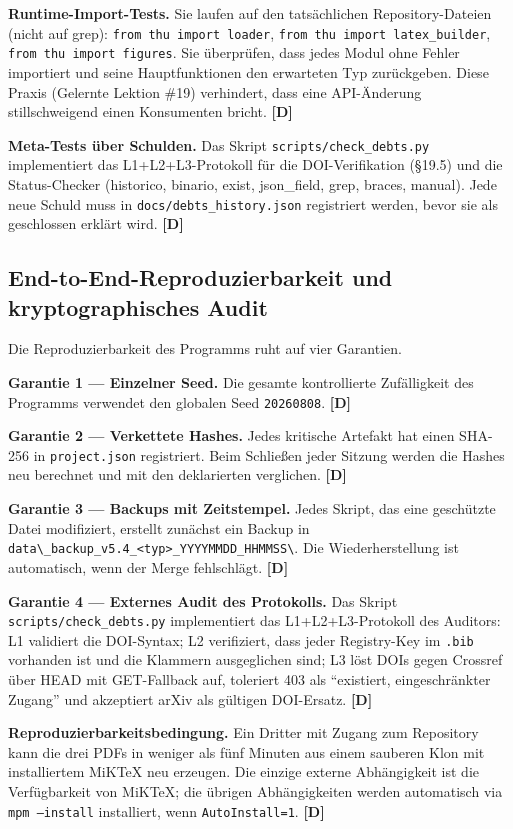 ﻿\documentclass[11pt,letterpaper]{article}
\begin{document}
\textbf{Runtime-Import-Tests.} Sie laufen auf den tatsächlichen Repository-Dateien (nicht auf grep): \texttt{from thu import loader}, \texttt{from thu import latex\_builder}, \texttt{from thu import figures}. Sie überprüfen, dass jedes Modul ohne Fehler importiert und seine Hauptfunktionen den erwarteten Typ zurückgeben. Diese Praxis (Gelernte Lektion \#19) verhindert, dass eine API-Änderung stillschweigend einen Konsumenten bricht. \textbf{[D]}

\textbf{Meta-Tests über Schulden.} Das Skript \texttt{scripts/check\_debts.py} implementiert das L1+L2+L3-Protokoll für die DOI-Verifikation (§19.5) und die Status-Checker (historico, binario, exist, json\_field, grep, braces, manual). Jede neue Schuld muss in \texttt{docs/debts\_history.json} registriert werden, bevor sie als geschlossen erklärt wird. \textbf{[D]}
\subsection{End-to-End-Reproduzierbarkeit und kryptographisches Audit}
Die Reproduzierbarkeit des Programms ruht auf vier Garantien.

\textbf{Garantie 1 --- Einzelner Seed.} Die gesamte kontrollierte Zufälligkeit des Programms verwendet den globalen Seed \texttt{20260808}. \textbf{[D]}

\textbf{Garantie 2 --- Verkettete Hashes.} Jedes kritische Artefakt hat einen SHA-256 in \texttt{project.json} registriert. Beim Schließen jeder Sitzung werden die Hashes neu berechnet und mit den deklarierten verglichen. \textbf{[D]}

\textbf{Garantie 3 --- Backups mit Zeitstempel.} Jedes Skript, das eine geschützte Datei modifiziert, erstellt zunächst ein Backup in \texttt{data\textbackslash\_backup\_v5.4\_<typ>\_YYYYMMDD\_HHMMSS\textbackslash}. Die Wiederherstellung ist automatisch, wenn der Merge fehlschlägt. \textbf{[D]}

\textbf{Garantie 4 --- Externes Audit des Protokolls.} Das Skript \texttt{scripts/check\_debts.py} implementiert das L1+L2+L3-Protokoll des Auditors: L1 validiert die DOI-Syntax; L2 verifiziert, dass jeder Registry-Key im \texttt{.bib} vorhanden ist und die Klammern ausgeglichen sind; L3 löst DOIs gegen Crossref über HEAD mit GET-Fallback auf, toleriert 403 als ``existiert, eingeschränkter Zugang'' und akzeptiert arXiv als gültigen DOI-Ersatz. \textbf{[D]}

\textbf{Reproduzierbarkeitsbedingung.} Ein Dritter mit Zugang zum Repository kann die drei PDFs in weniger als fünf Minuten aus einem sauberen Klon mit installiertem MiKTeX neu erzeugen. Die einzige externe Abhängigkeit ist die Verfügbarkeit von MiKTeX; die übrigen Abhängigkeiten werden automatisch via \texttt{mpm --install} installiert, wenn \texttt{AutoInstall=1}. \textbf{[D]}
\end{document}

